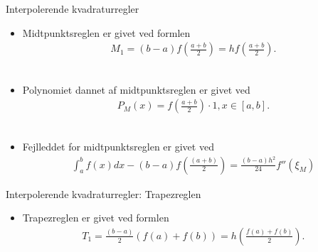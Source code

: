 \begin{frame}{Interpolerende kvadraturregler}
\begin{itemize}
    \item Midtpunktsreglen er givet ved formlen
    \begin{align*}
        M_1 = (b-a)f(\frac{a+b}{2})=hf(\frac{a+b}{2}).    
    \end{align*}
    \\
    \item Polynomiet dannet af midtpunktsreglen er givet ved 
    \begin{align*}
        P_{M}(x)=f(\frac{a+b}{2}) \cdot 1, x \in \left [a,b  \right ].
    \end{align*}
    \\
    \item Fejlleddet for midtpunktsreglen er givet ved 
    \begin{align*}
        \int_{a}^{b}f(x)dx-(b-a)f(\frac{(a+b)}{2})=\frac{(b-a)h^2}{24}{f}''(\xi_M)
    \end{align*}
\end{itemize}
\end{frame}


\begin{frame}{Interpolerende kvadraturregler: Trapezreglen}
\begin{itemize}
    \item %
    Trapezreglen er givet ved formlen 
    \begin{align*}
    T_1 = \frac{(b-a)}{2}(f(a)+f(b))=h (\frac{f(a)+f(b)}{2}).
    \end{align*}
    \end{itemize}
           
\end{frame}



